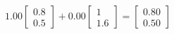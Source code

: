 \documentclass[preview]{standalone}
\begin{document}
\begin{align*}
1.00 \begin{bmatrix} 0.8 \\ 0.5 \end{bmatrix} + 0.00 \begin{bmatrix} 1 \\ 1.6 \end{bmatrix} = \begin{bmatrix} 0.80 \\ 0.50 \end{bmatrix}
\end{align*}
\end{document}
